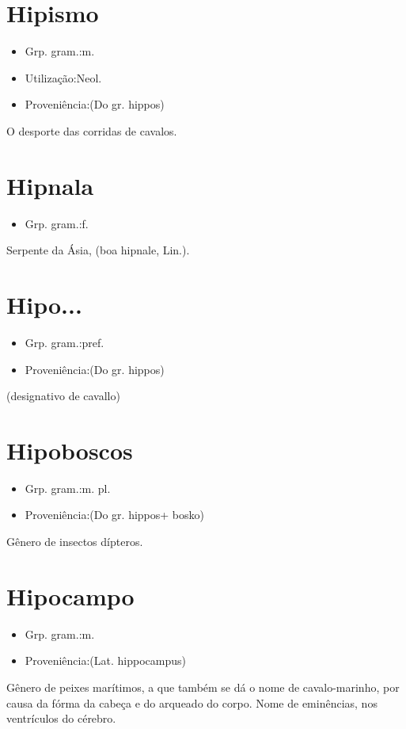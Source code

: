 \documentclass{article}
\begin{document}
\section{Hipismo}
\begin{itemize}
\item {Grp. gram.:m.}
\end{itemize}
\begin{itemize}
\item {Utilização:Neol.}
\end{itemize}
\begin{itemize}
\item {Proveniência:(Do gr. \textunderscore hippos\textunderscore )}
\end{itemize}
O desporte das corridas de cavalos.
\section{Hipnala}
\begin{itemize}
\item {Grp. gram.:f.}
\end{itemize}
Serpente da Ásia, (\textunderscore boa hipnale\textunderscore , Lin.).
\section{Hipo...}
\begin{itemize}
\item {Grp. gram.:pref.}
\end{itemize}
\begin{itemize}
\item {Proveniência:(Do gr. \textunderscore hippos\textunderscore )}
\end{itemize}
(designativo de \textunderscore cavallo\textunderscore )
\section{Hipoboscos}
\begin{itemize}
\item {Grp. gram.:m. pl.}
\end{itemize}
\begin{itemize}
\item {Proveniência:(Do gr. \textunderscore hippos\textunderscore  + \textunderscore bosko\textunderscore )}
\end{itemize}
Gênero de insectos dípteros.
\section{Hipocampo}
\begin{itemize}
\item {Grp. gram.:m.}
\end{itemize}
\begin{itemize}
\item {Proveniência:(Lat. \textunderscore hippocampus\textunderscore )}
\end{itemize}
Gênero de peixes marítimos, a que também se dá o nome de \textunderscore cavalo-marinho\textunderscore , por causa da fórma da cabeça e do arqueado do corpo.
Nome de eminências, nos ventrículos do cérebro.
\end{document}
